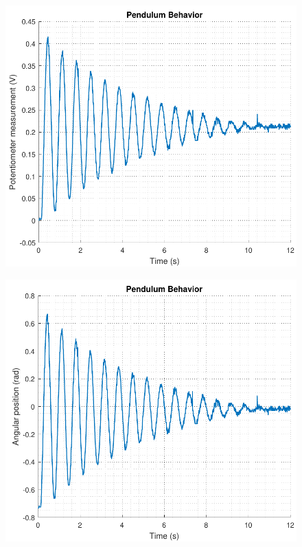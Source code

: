 \begin{minipage}{\linewidth}
	\begin{minipage}{0.45\linewidth}
		\begin{figure}[H]
			\includegraphics[scale=.53]{figures/PendVolt}
			\centering
			\vspace{-.4cm}
			\captionsetup{justification=centering}
			\label{PendVolt}
		\end{figure}%
	\end{minipage}
	\hspace{0.03\linewidth}
	\begin{minipage}{0.45\linewidth}
		\begin{figure}[H]\vspace{-4mm}
			\includegraphics[scale=.53]{figures/PendRad}

\end{figure}
\end{minipage}
\end{minipage}
